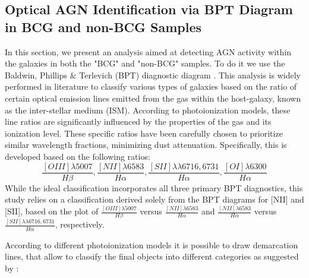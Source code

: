 \subsection{Optical AGN Identification via BPT Diagram in BCG and non-BCG Samples}
In this section, we present an analysis aimed at detecting AGN activity within the galaxies in both the "BCG" and "non-BCG" samples.
To do it we use the Baldwin, Phillips $\&$ Terlevich (BPT) diagnostic diagram \cite{1981PASP...93....5B}.
This analysis is widely performed in literature to classify various types of galaxies based on the ratio of certain optical emission lines emitted from the gas within the host-galaxy, known as the inter-stellar medium (ISM). According to photoionization models, these line ratios are significantly influenced by the properties of the gas and its ionization level.
These specific ratios have been carefully chosen to prioritize similar wavelength fractions, minimizing dust attenuation. Specifically, this is developed based on the following ratios: $$\textbf{$\frac{[OIII]\lambda 5007}{H\beta}$}, \textbf{$\frac{[NII]\lambda 6583}{H\alpha}$}, \textbf{$\frac{[SII]\lambda\lambda 6716,6731}{H\alpha}$}, \textbf{$\frac{[OI]\lambda 6300}{H\alpha}$}$$
While the ideal classification incorporates all three primary BPT diagnostics, this study relies on a classification derived solely from the BPT diagrams for [NII] and [SII], based on the plot of $\frac{[OIII]\lambda 5007}{H\beta}$ versus  $\frac{[NII]\lambda 6583}{H\alpha}$ and $\frac{[NII]\lambda 6583}{H\alpha}$ versus $\frac{[SII]\lambda\lambda 6716,6731}{H\alpha}$, respectively.

\newpage
According to different photoionization models it is possible to draw demarcation lines, that allow to classify the final objects into different categories as suggested by \cite{2006MNRAS.372..961K}: 

